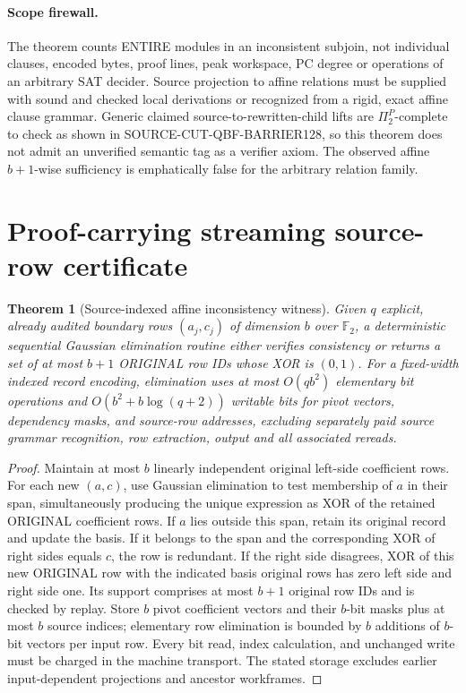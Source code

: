 \documentclass[11pt]{article}
\newtheorem{theorem}{Theorem}
\newcommand{\GF}{\mathbb F_2}
\begin{document}
\paragraph{Scope firewall.}
The theorem counts ENTIRE modules in an inconsistent subjoin, not individual clauses, encoded bytes, proof lines, peak workspace, PC degree or operations of an arbitrary SAT decider. Source projection to affine relations must be supplied with sound and checked local derivations or recognized from a rigid, exact affine clause grammar. Generic claimed source-to-rewritten-child lifts are $\Pi_2^P$-complete to check as shown in SOURCE-CUT-QBF-BARRIER128, so this theorem does not admit an unverified semantic tag as a verifier axiom. The observed affine $b+1$-wise sufficiency is emphatically false for the arbitrary relation family.

\section{Proof-carrying streaming source-row certificate}
\begin{theorem}[Source-indexed affine inconsistency witness]\label{th:stream}
Given $q$ explicit, already audited boundary rows $(a_j,c_j)$ of dimension $b$ over $\GF$, a deterministic sequential Gaussian elimination routine either verifies consistency or returns a set of at most $b+1$ ORIGINAL row IDs whose XOR is $(0,1)$. For a fixed-width indexed record encoding, elimination uses at most $O(qb^2)$ elementary bit operations and $O(b^2+b\log(q+2))$ writable bits for pivot vectors, dependency masks, and source-row addresses, excluding separately paid source grammar recognition, row extraction, output and all associated rereads.
\end{theorem}
\begin{proof}
Maintain at most $b$ linearly independent original left-side coefficient rows. For each new $(a,c)$, use Gaussian elimination to test membership of $a$ in their span, simultaneously producing the unique expression as XOR of the retained ORIGINAL coefficient rows. If $a$ lies outside this span, retain its original record and update the basis. If it belongs to the span and the corresponding XOR of right sides equals $c$, the row is redundant. If the right side disagrees, XOR of this new ORIGINAL row with the indicated basis original rows has zero left side and right side one. Its support comprises at most $b+1$ original row IDs and is checked by replay. Store $b$ pivot coefficient vectors and their $b$-bit masks plus at most $b$ source indices; elementary row elimination is bounded by $b$ additions of $b$-bit vectors per input row. Every bit read, index calculation, and unchanged write must be charged in the machine transport. The stated storage excludes earlier input-dependent projections and ancestor workframes.
\end{proof}
\end{document}
